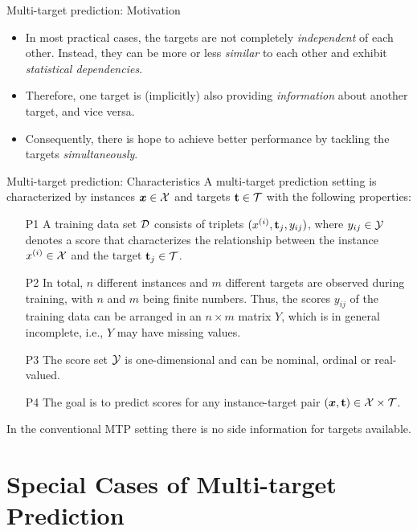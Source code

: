 \begin{vbframe}{Multi-target prediction: Motivation}
{\begin{itemize}
%	
		\item In most practical cases, the targets are not completely \emph{independent} of each other. Instead, they can be more or less \emph{similar} to each other and exhibit \emph{statistical dependencies}.
%		
		\item Therefore, one target is (implicitly) also providing \emph{information} about another target, and vice versa.
%		
		\item Consequently, there is hope to achieve better performance by tackling the targets \emph{simultaneously}.
%

  \end{itemize}}
%
\end{vbframe}

\begin{frame}{Multi-target prediction: Characteristics}
% 
	\small
		A multi-target prediction setting is characterized by instances $\bm{x} \in \mathcal{X}$ and targets $\mathbf{t} \in \mathcal{T}$ with the following properties: 
%		
		\begin{itemize} \small
%		
			\item[P1] A training data set $\mathcal{D}$ consists of triplets $(x^{(i)},\mathbf{t}_j,y_{ij})$, where $y_{ij} \in \mathcal{Y}$ denotes a score that characterizes the relationship between the instance $x^{(i)} \in \mathcal{X}$ and the target $\mathbf{t}_j \in \mathcal{T}$.  
%			
			\item[P2] In total, $n$ different instances and $m$ different targets are observed during training, with $n$ and $m$ being finite numbers. Thus, the scores $y_{ij}$ of the training data can be arranged in an $n \times m$ matrix $Y$, which is in general incomplete, i.e., $Y$ may have missing values.
%			
			\item[P3] The score set $\mathcal{Y}$ is one-dimensional and can be nominal, ordinal or real-valued.  
%			
			\item[P4] The goal is to predict scores for any instance-target pair $(\bm{x},\mathbf{t}) \in \mathcal{X} \times \mathcal{T}$.   
%		
		\end{itemize}
% 
%
In the conventional MTP setting there is no side information for targets available. 
%	
%
\end{frame}

\section{Special Cases of Multi-target Prediction}

